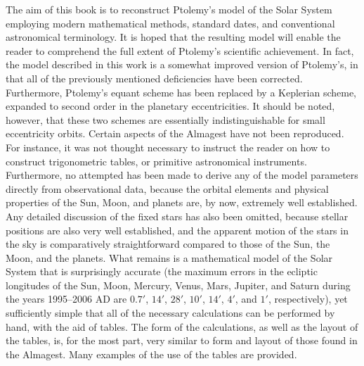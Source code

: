The aim of this book is to reconstruct Ptolemy's model of the Solar System employing
modern  mathematical methods, standard dates, and conventional astronomical terminology. It
is hoped that the resulting model will enable the reader to comprehend the full extent of Ptolemy's scientific
achievement. In fact, the model described
in this work is a somewhat improved version of Ptolemy's, in that
all of the  previously mentioned deficiencies   have been corrected. Furthermore, Ptolemy's equant scheme has been replaced by a Keplerian scheme, expanded to second order in the planetary
eccentricities.
It should be noted, however, that these two schemes are essentially indistinguishable for
small eccentricity orbits. 
Certain aspects of the Almagest have not been reproduced. For instance, it was not thought necessary to instruct the reader on how to construct
trigonometric tables, or primitive astronomical instruments. Furthermore, no attempted has been made to derive any of the model parameters directly from
 observational data, because the orbital elements and physical properties of the Sun, Moon, and planets are, by now, extremely well established. Any detailed discussion of the fixed stars has also been omitted, because stellar positions  are also very well established, and the apparent motion
 of the stars in the sky is comparatively straightforward compared to those of the Sun, the Moon, and the planets. 
 What remains is a mathematical model of the Solar
 System that is surprisingly accurate (the maximum errors in the ecliptic
 longitudes of the Sun, Moon, Mercury, Venus, Mars, Jupiter, and
 Saturn during the years 1995--2006 AD are $0.7'$, $14'$, $28'$, $10'$,
 $14'$, $4'$, and $1'$, respectively), yet sufficiently simple that all of the
 necessary calculations can be performed by hand, with the aid of tables. The form of the calculations, as well as the layout of the tables,
 is, for the most part, very similar to form and layout of those found in the Almagest. Many examples
 of the use of the tables are provided. 
